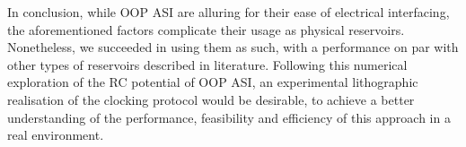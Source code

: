 In conclusion, while OOP ASI are alluring for their ease of electrical interfacing, the aforementioned factors complicate their usage as physical reservoirs.
Nonetheless, we succeeded in using them as such, with a performance on par with other types of reservoirs described in literature.
Following this numerical exploration of the RC potential of OOP ASI, an experimental lithographic realisation of the clocking protocol would be desirable, to achieve a better understanding of the performance, feasibility and efficiency of this approach in a real environment.






